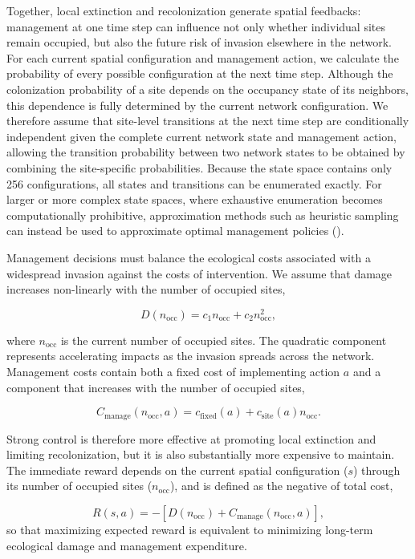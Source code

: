 \documentclass[
  11pt,
  a4paper,
]{article}
\begin{document}
Together, local extinction and recolonization generate spatial feedbacks: management at one time step can influence not only whether individual sites remain occupied, but also the future risk of invasion elsewhere in the network. For each current spatial configuration and management action, we calculate the probability of every possible configuration at the next time step. Although the colonization probability of a site depends on the occupancy state of its neighbors, this dependence is fully determined by the current network configuration. We therefore assume that site-level transitions at the next time step are conditionally independent given the complete current network state and management action, allowing the transition probability between two network states to be obtained by combining the site-specific probabilities. Because the state space contains only 256 configurations, all states and transitions can be enumerated exactly. For larger or more complex state spaces, where exhaustive enumeration becomes computationally prohibitive, approximation methods such as heuristic sampling can instead be used to approximate optimal management policies ().

Management decisions must balance the ecological costs associated with a widespread invasion against the costs of intervention. We assume that damage increases non-linearly with the number of occupied sites,

\[
D(n_{\mathrm{occ}})
=
c_1 n_{\mathrm{occ}}
+
c_2 n_{\mathrm{occ}}^2,
\]

where \(n_{\mathrm{occ}}\) is the current number of occupied sites. The quadratic component represents accelerating impacts as the invasion spreads across the network. Management costs contain both a fixed cost of implementing action \(a\) and a component that increases with the number of occupied sites,

\[
C_{\mathrm{manage}}(n_{\mathrm{occ}},a)
=
c_{\mathrm{fixed}}(a)
+
c_{\mathrm{site}}(a)n_{\mathrm{occ}}.
\]

Strong control is therefore more effective at promoting local extinction and limiting recolonization, but it is also substantially more expensive to maintain. The immediate reward depends on the current spatial configuration (\(s\)) through its number of occupied sites (\(n_{\mathrm{occ}}\)), and is defined as the negative of total cost,

\[
R(s,a)
=
-
\left[
D(n_{\mathrm{occ}})
+
C_{\mathrm{manage}}(n_{\mathrm{occ}},a)
\right],
\]
so that maximizing expected reward is equivalent to minimizing long-term ecological damage and management expenditure.
\end{document}
